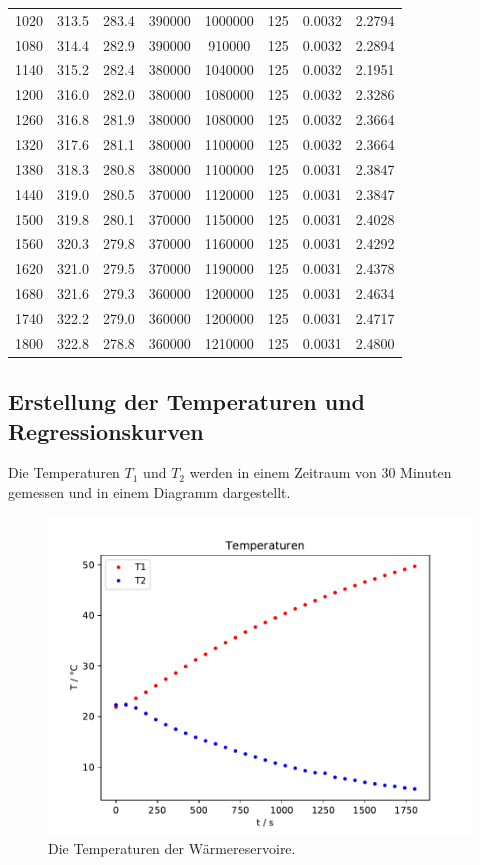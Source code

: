 \begin{table}[H]
\begin{tabular}{c c c c c c c c}
    1020  &  313.5 &  283.4 & 390000  & 1000000 & 125 & 0.0032 & 2.2794 \\
    1080  &  314.4 &  282.9 & 390000  &  910000 & 125 & 0.0032 & 2.2894 \\
    1140  &  315.2 &  282.4 & 380000  & 1040000 & 125 & 0.0032 & 2.1951 \\
    1200  &  316.0 &  282.0 & 380000  & 1080000 & 125 & 0.0032 & 2.3286 \\
    1260  &  316.8 &  281.9 & 380000  & 1080000 & 125 & 0.0032 & 2.3664 \\
    1320  &  317.6 &  281.1 & 380000  & 1100000 & 125 & 0.0032 & 2.3664 \\
    1380  &  318.3 &  280.8 & 380000  & 1100000 & 125 & 0.0031 & 2.3847 \\
    1440  &  319.0 &  280.5 & 370000  & 1120000 & 125 & 0.0031 & 2.3847 \\
    1500  &  319.8 &  280.1 & 370000  & 1150000 & 125 & 0.0031 & 2.4028 \\
    1560  &  320.3 &  279.8 & 370000  & 1160000 & 125 & 0.0031 & 2.4292 \\
    1620  &  321.0 &  279.5 & 370000  & 1190000 & 125 & 0.0031 & 2.4378 \\
    1680  &  321.6 &  279.3 & 360000  & 1200000 & 125 & 0.0031 & 2.4634 \\
    1740  &  322.2 &  279.0 & 360000  & 1200000 & 125 & 0.0031 & 2.4717 \\
    1800  &  322.8 &  278.8 & 360000  & 1210000 & 125 & 0.0031 & 2.4800 \\
    \bottomrule
  \end{tabular}
\end{table}
\subsection{Erstellung der Temperaturen und Regressionskurven}
Die Temperaturen $T_1$ und $T_2$ werden in einem Zeitraum von 30 Minuten gemessen und in einem Diagramm dargestellt.

\begin{figure}[H]
  \centering
  \includegraphics{build/Temperaturen.pdf}
  \caption{Die Temperaturen der Wärmereservoire.}
  \label{fig:Temperaturen}
\end{figure}

